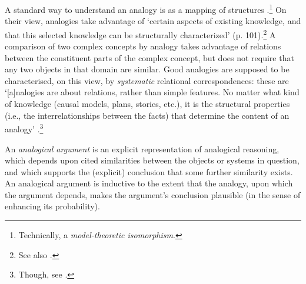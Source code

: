 \documentclass{amsart}
\theoremstyle{indented}
\theoremstyle{indentedProp}
\theoremstyle{indented}
\theoremstyle{indented}
\theoremstyle{indented}
\theoremstyle{indented}
\theoremstyle{indented}
\begin{document}
A standard way to understand an analogy is as a mapping of structures \citep{Gentner-Gentner-1983}.\footnote{Technically, a {\it model-theoretic isomorphism}.} On their view, analogies take advantage of `certain aspects of existing knowledge, and that this selected knowledge can be structurally characterized' (p. 101).\footnote{See also \citet{Gentner-1983, Gick-Holyoak-1983, Holyoak-Thagard-1989, Holyoak-Thagard-1995, Forbus-et-al-1994, Forbus-et-al-1995, Forbus-2001, Gentner-et-al-2001b, Dunbar-2001}.} A comparison of two complex concepts by analogy takes advantage of relations between the constituent parts of the complex concept, but does not require that any two objects in that domain are similar. Good analogies are supposed to be characterised, on this view, by {\it systematic} relational correspondences: these are `[a]nalogies are about relations, rather than simple features. No matter what kind of knowledge (causal models, plans, stories, etc.), it is the structural properties (i.e., the interrelationships between the facts) that determine the content of an analogy' \citep[p. 3]{Falkenhainer-et-al-1989}.\footnote{Though, see \citet{Schlimm-2008}.}

An {\it analogical argument} is an explicit representation of analogical reasoning, which depends upon cited similarities between the objects or systems in question, and which supports the (explicit) conclusion that some further similarity exists. An analogical argument is inductive to the extent that the analogy, upon which the argument depends, makes the argument's conclusion plausible (in the sense of enhancing its probability).
\end{document}

